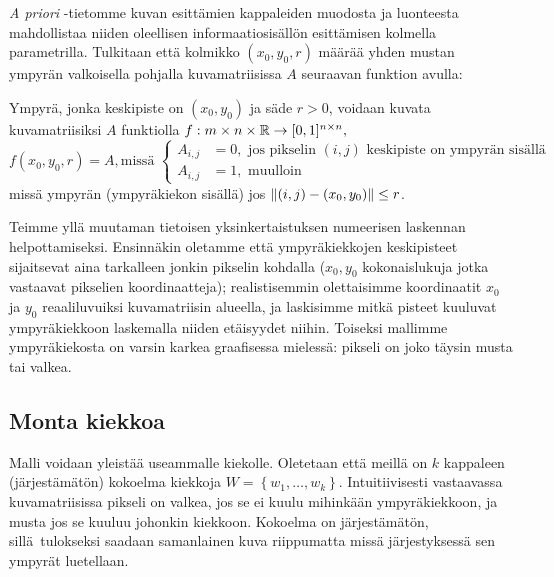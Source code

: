 \emph{A priori} -tietomme kuvan esittämien kappaleiden muodosta ja luonteesta mahdollistaa niiden oleellisen informaatiosisällön esittämisen kolmella parametrilla. Tulkitaan että kolmikko $(x_0, y_0, r)$ määrää yhden mustan ympyrän valkoisella pohjalla kuvamatriisissa $A$ seuraavan funktion avulla:
\begin{maar}
    Ympyrä, jonka keskipiste on $(x_0, y_0)$ ja säde $r > 0$, voidaan kuvata kuvamatriisiksi $A$ funktiolla
    $f: m\times n\times \mathbb{R} \to [0, 1]^{n\times n},$
    \begin{equation*}
        f(x_0, y_0, r) = A, \text{missä }
        \begin{cases}
            A_{i,j} &= 0, \text{ jos pikselin $(i,j)$ keskipiste on ympyrän sisällä}\\
            A_{i,j} &= 1, \text{ muulloin}
        \end{cases}
    \end{equation*}
    missä ympyrän (ympyräkiekon sisällä) jos $\lVert (i, j) - (x_0, y_0) \rVert \leq r$.
\end{maar}

Teimme yllä muutaman tietoisen yksinkertaistuksen numeerisen laskennan helpottamiseksi.
Ensinnäkin oletamme että ympyräkiekkojen keskipisteet sijaitsevat aina tarkalleen jonkin pikselin kohdalla ($x_0, y_0$ kokonaislukuja jotka vastaavat pikselien koordinaatteja);
realistisemmin olettaisimme koordinaatit $x_0$ ja $y_0$ reaaliluvuiksi kuvamatriisin alueella, ja laskisimme mitkä pisteet kuuluvat ympyräkiekkoon laskemalla niiden etäisyydet niihin.
Toiseksi mallimme ympyräkiekosta on varsin karkea graafisessa mielessä:
pikseli on joko täysin musta tai valkea.

\subsection{Monta kiekkoa}
\label{sub:monta_kiekkoa}

Malli voidaan yleistää useammalle kiekolle.
Oletetaan että meillä on $k$ kappaleen (järjestämätön) kokoelma kiekkoja $W = \left\{w_1, \dots, w_k\right\}$.
Intuitiivisesti vastaavassa kuvamatriisissa pikseli on valkea, jos se ei kuulu mihinkään ympyräkiekkoon, ja musta jos se kuuluu johonkin kiekkoon.
Kokoelma on järjestämätön, sillä tulokseksi saadaan samanlainen kuva riippumatta missä järjestyksessä sen ympyrät luetellaan.

